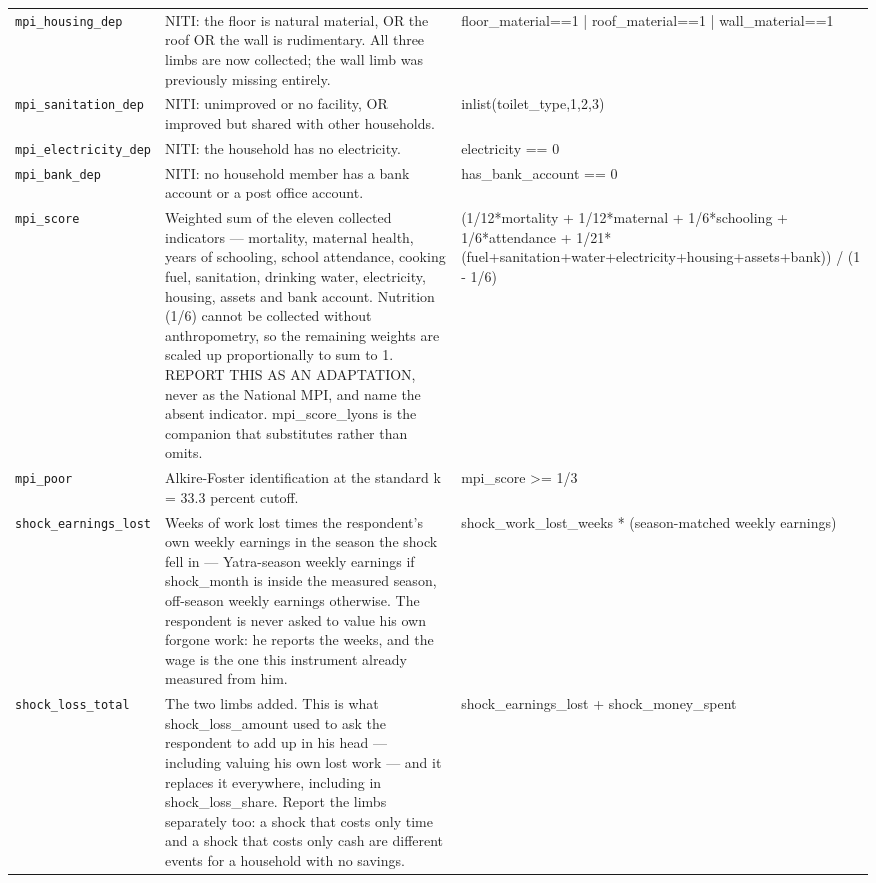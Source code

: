 \documentclass[10pt]{article}
\begin{document}
{\begin{longtable}{p{3.3cm}p{7.6cm}p{5.7cm}}
\texttt{mpi\_housing\_dep} & NITI: the floor is natural material, OR the roof OR the wall is rudimentary. All three limbs are now collected; the wall limb was previously missing entirely. & floor\_material==1 | roof\_material==1 | wall\_material==1 \\
\texttt{mpi\_sanitation\_dep} & NITI: unimproved or no facility, OR improved but shared with other households. & inlist(toilet\_type,1,2,3) \\
\texttt{mpi\_electricity\_dep} & NITI: the household has no electricity. & electricity == 0 \\
\texttt{mpi\_bank\_dep} & NITI: no household member has a bank account or a post office account. & has\_bank\_account == 0 \\
\texttt{mpi\_score} & Weighted sum of the eleven collected indicators — mortality, maternal health, years of schooling, school attendance, cooking fuel, sanitation, drinking water, electricity, housing, assets and bank account. Nutrition (1/6) cannot be collected without anthropometry, so the remaining weights are scaled up proportionally to sum to 1. REPORT THIS AS AN ADAPTATION, never as the National MPI, and name the absent indicator. mpi\_score\_lyons is the companion that substitutes rather than omits. & (1/12*mortality + 1/12*maternal + 1/6*schooling + 1/6*attendance + 1/21*(fuel+sanitation+water+electricity+housing+assets+bank)) / (1 - 1/6) \\
\texttt{mpi\_poor} & Alkire-Foster identification at the standard k = 33.3 percent cutoff. & mpi\_score >= 1/3 \\
\texttt{shock\_earnings\_lost} & Weeks of work lost times the respondent's own weekly earnings in the season the shock fell in — Yatra-season weekly earnings if shock\_month is inside the measured season, off-season weekly earnings otherwise. The respondent is never asked to value his own forgone work: he reports the weeks, and the wage is the one this instrument already measured from him. & shock\_work\_lost\_weeks * (season-matched weekly earnings) \\
\texttt{shock\_loss\_total} & The two limbs added. This is what shock\_loss\_amount used to ask the respondent to add up in his head — including valuing his own lost work — and it replaces it everywhere, including in shock\_loss\_share. Report the limbs separately too: a shock that costs only time and a shock that costs only cash are different events for a household with no savings. & shock\_earnings\_lost + shock\_money\_spent \\

\end{longtable}}
\end{document}
